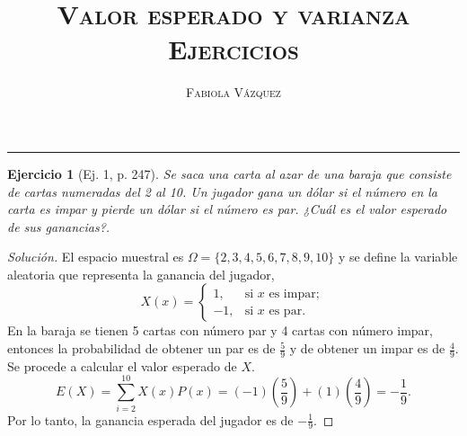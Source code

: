 \documentclass[12pt,letterpaper]{article}
\title{\textsc{Valor esperado y varianza \\ Ejercicios}}
\author{\textsc{Fabiola Vázquez}}
\newtheorem{ej}{Ejercicio}
\begin{document}
\maketitle

\hrule
\begin{ej}[Ej. 1, p. 247] 
Se saca una carta al azar de una baraja que consiste de cartas numeradas del 2 al 10. Un jugador gana un dólar si el número en la carta es impar y pierde un dólar si el número es par. ¿Cuál es el valor esperado de sus ganancias?.
\end{ej}
\begin{proof}[Solución]
El espacio muestral es $\Omega = \{2,3,4,5,6,7,8,9,10\}$ y se define la variable aleatoria que representa la ganancia del jugador,  
\begin{equation}
X(x) =
\begin{cases}
1, & \text{si } x \text{ es impar};\\
-1, & \text{si } x \text{ es par}.
\end{cases}
\end{equation}
En la baraja se tienen 5 cartas con número par y 4 cartas con número impar, entonces la probabilidad de obtener un par es de $\frac{5}{9}$ y de obtener un impar es de $\frac{4}{9}$. Se procede a calcular el valor esperado de $X$.
\begin{equation}
E(X)=\sum_{i=2}^{10} X(x)P(x) = (-1)\left(\frac{5}{9}\right) + (1)\left(\frac{4}{9}\right) = -\frac{1}{9}.
\end{equation}
Por lo tanto, la ganancia esperada del jugador es de $-\frac{1}{9}$.
\end{proof}
\end{document}

